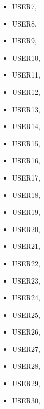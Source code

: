 \begin{itemize}
\item        USER7,
\item        USER8,
\item        USER9,
\item        USER10,
\item        USER11,
\item        USER12,
\item        USER13,
\item        USER14,
\item        USER15,
\item        USER16,
\item        USER17,
\item        USER18,
\item        USER19,
\item        USER20,
\item        USER21,
\item        USER22,
\item        USER23,
\item        USER24,
\item        USER25,
\item        USER26,
\item        USER27,
\item        USER28,
\item        USER29,
\item        USER30,
\end{itemize}
